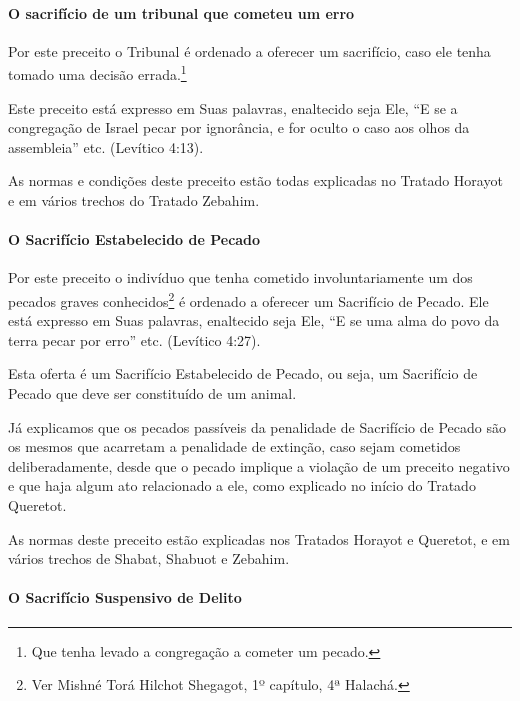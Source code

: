 \paragraph{O sacrifício de um tribunal que cometeu um erro}

Por este preceito o Tribunal é ordenado a oferecer um sacrifício, caso
ele tenha tomado uma decisão errada.\footnote{Que tenha levado a congregação a cometer um pecado.}

Este preceito está expresso em Suas palavras, enaltecido seja Ele, ``E
se a congregação de Israel pecar por ignorância, e for oculto o caso aos
olhos da assembleia'' etc. (Levítico 4:13).

As normas e condições deste preceito estão todas explicadas no Tratado
Horayot e em vários trechos do Tratado Zebahim.

\paragraph{O Sacrifício Estabelecido de Pecado}

Por este preceito o indivíduo que
tenha cometido involuntariamente um dos pecados graves
conhecidos\footnote{Ver Mishné Torá Hilchot Shegagot, 1º capítulo, 4ª Halachá.} é ordenado a oferecer um Sacrifício de
Pecado. Ele está expresso em Suas palavras, enaltecido seja Ele, ``E se
uma alma do povo da terra pecar por erro'' etc. (Levítico 4:27).

Esta oferta é um Sacrifício Estabelecido de Pecado, ou seja, um Sacrifício de Pecado que deve ser constituído de um animal.

Já explicamos que os pecados passíveis da penalidade de Sacrifício de
Pecado são os mesmos que acarretam a penalidade de extinção, caso sejam
cometidos deliberadamente, desde que o pecado implique a violação de um
preceito negativo e que haja algum ato relacionado a ele, como explicado
no início do Tratado Queretot.

As normas deste preceito estão explicadas nos Tratados Horayot e
Queretot, e em vários trechos de Shabat, Shabuot e Zebahim.

\paragraph{O Sacrifício Suspensivo de Delito}


